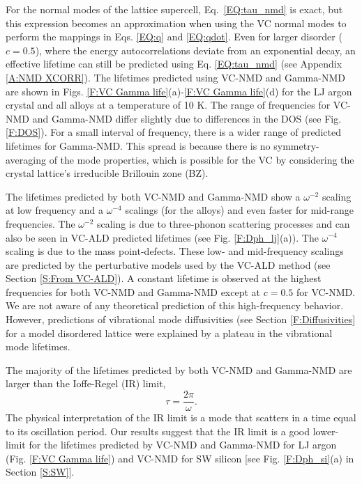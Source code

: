 \documentclass[aps,prb,onecolumn,preprint,footinbib,superscriptaddress,amsmath,amssymb,floatfix]{revtex4}
\begin{document}
For the normal modes of the lattice supercell, 
Eq.~\eqref{EQ:tau_nmd} is exact, but this expression becomes an 
approximation when 
using the VC normal modes to perform the mappings in Eqs.  
\eqref{EQ:q} and \eqref{EQ:qdot}. 
Even for larger disorder ($c=0.5$),  
where the energy autocorrelations 
deviate from an exponential decay, 
an effective lifetime can still be predicted 
using Eq. \eqref{EQ:tau_nmd} (see Appendix \ref{A:NMD XCORR}). 
The lifetimes predicted using VC-NMD and Gamma-NMD  
are shown in Figs. \ref{F:VC Gamma life}(a)-\ref{F:VC Gamma life}(d) 
for the LJ argon crystal and all alloys at a temperature of 10 K. 
The range of frequencies for 
VC-NMD and Gamma-NMD differ slightly due to differences in 
the DOS (see Fig. \ref{F:DOS}). 
For a small interval of frequency, there is a wider range of 
predicted lifetimes for Gamma-NMD. This spread is because there 
is no symmetry-averaging of the mode properties, 
which is possible for the VC by considering the crystal 
lattice's irreducible Brillouin zone (BZ).\cite{ashcroft_solid_1976} 

The lifetimes predicted by both VC-NMD and Gamma-NMD 
show a $\omega^{-2}$ scaling at low frequency and a $\omega^{-4}$ 
scalings (for the alloys) and 
even faster for mid-range frequencies. The $\omega^{-2}$ scaling 
is due to three-phonon scattering processes
\cite{callaway_model_1959,maradudin_scattering_1962} and can also be seen in 
VC-ALD predicted lifetimes (see Fig. \ref{F:Dph_lj}(a)). The 
$\omega^{-4}$ scaling is due to the mass point-defects. 
These low- and mid-frequency 
scalings are predicted by the perturbative models used by 
the VC-ALD method (see Section \ref{S:From VC-ALD}). 
A constant lifetime is observed at the highest frequencies  
for both VC-NMD and Gamma-NMD except at $c=0.5$ for VC-NMD. We are not 
aware of any theoretical prediction of this high-frequency behavior. However, 
predictions of vibrational mode diffusivities (see Section \ref{F:Diffusivities} 
for a model disordered lattice were explained by a plateau in the vibrational 
mode lifetimes.\cite{sheng_heat_1991} 

The majority of the lifetimes predicted by both VC-NMD and 
Gamma-NMD are larger than the Ioffe-Regel (IR) limit,
\cite{taraskin_determination_1999} 
\begin{equation}\label{EQ:IR}
\tau = \frac{2\pi}{\omega}.
\end{equation}
The physical interpretation of the IR limit is a mode that  
scatters in a time equal to its oscillation period. Our results suggest 
that the IR limit is a good lower-limit for the lifetimes predicted 
by VC-NMD and Gamma-NMD 
for LJ argon (Fig. \ref{F:VC Gamma life}) 
and VC-NMD for SW silicon [see Fig. \ref{F:Dph_si}(a) in 
Section \ref{S:SW}]. 
\end{document}
